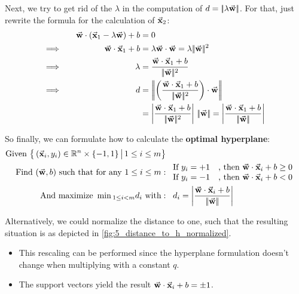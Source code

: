 Next, we try to get rid of the $\lambda$ in the computation of $d = |\!|  \lambda \vec{\mathbf{w}}  |\!|$. For that, just rewrite the formula for the calculation of $\vec{\mathbf{x}}_2$:
\begin{align*}\begin{aligned}
  && \cv{w}\cdot(\cv{x}_1 - \lambda \cv{w}) + b &= 0\\
  \Longrightarrow\quad && \cv{w}\cdot\cv{x}_1 + b &= \lambda \cv{w} \cdot \cv{w} = \lambda \norm{\cv{w}}^2\\
  \Longrightarrow\quad && \lambda  &= \frac{\cv{w}\cdot\cv{x}_1 + b}{\norm{\cv{w}}^2} \\
  \Longrightarrow\quad && d  &= \left|\!\left| \left(\frac{\cv{w}\cdot\cv{x}_1 + b}{\norm{\cv{w}}^2}\right)\cdot\cv{w} \right|\!\right|\\
  &&& = \left| \frac{\cv{w}\cdot\cv{x}_1 + b}{\norm{\cv{w}}^2} \right|\,\norm{\cv{w}} = \left| \frac{\cv{w}\cdot\cv{x}_1 + b}{\norm{\cv{w}}} \right|
\end{aligned}\end{align*}

So finally, we can formulate how to calculate the \textbf{optimal hyperplane}:
\begin{align*}\begin{aligned}
  \textnormal{\color{black}{Given }} \big\{ \left(\vec{\mathbf{x}}_i, y_i\right) \in \mathbb{R}^n\times\{-1,1\} \,\big|\, 1\leq i \leq m \big\}\\
  \textnormal{\color{black}{Find }} (\vec{\mathbf{w}}, b) \textnormal{\color{black}{ such that for any }} 1\leq i \leq m:
  &\ \begin{array}{ll}
    \textnormal{\color{black}{If }} y_i = +1 & \textnormal{\color{black}{, then }} \vec{\mathbf{w}}\cdot\vec{\mathbf{x}}_i + b \geq 0\\
    \textnormal{\color{black}{If }} y_i = -1 & \textnormal{\color{black}{, then }} \vec{\mathbf{w}}\cdot\vec{\mathbf{x}}_i + b < 0
  \end{array}\\
  \textnormal{\color{black}{And maximize }} \min {}_{1\leq i<m}d_i \textnormal{\color{black}{ with}}:
  &\ \ \,d_i = \left| \frac{\vec{\mathbf{w}}\cdot\vec{\mathbf{x}}_i + b}{|\!| \vec{\mathbf{w}} |\!|} \right|
\end{aligned}\end{align*}

Alternatively, we could normalize the distance to one, such that the resulting situation is as depicted in \ref{fig:5_distance_to_h_normalized}.
\begin{itemize}
  \item This rescaling can be performed since the hyperplane formulation doesn't change when multiplying with a constant $q$.
  \item The support vectors yield the result $\vec{\mathbf{w}}\cdot\vec{\mathbf{x}}_i + b = \pm 1$.
\end{itemize}

